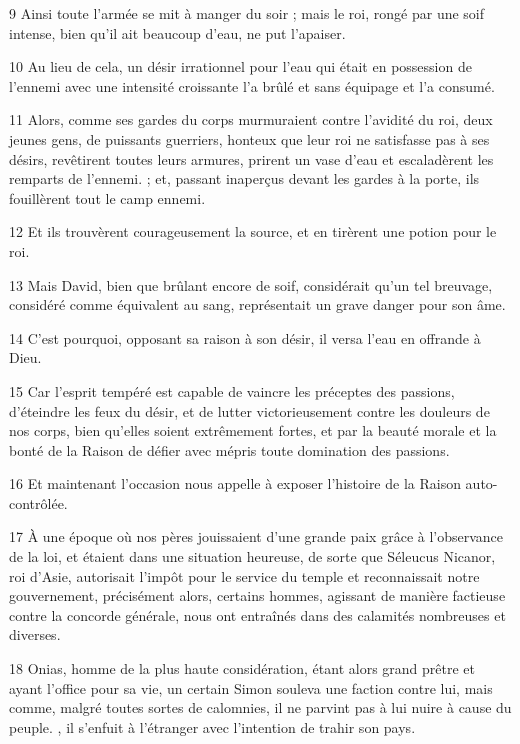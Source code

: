 \par 9 Ainsi toute l'armée se mit à manger du soir ; mais le roi, rongé par une soif intense, bien qu'il ait beaucoup d'eau, ne put l'apaiser.

\par 10 Au lieu de cela, un désir irrationnel pour l'eau qui était en possession de l'ennemi avec une intensité croissante l'a brûlé et sans équipage et l'a consumé.

\par 11 Alors, comme ses gardes du corps murmuraient contre l'avidité du roi, deux jeunes gens, de puissants guerriers, honteux que leur roi ne satisfasse pas à ses désirs, revêtirent toutes leurs armures, prirent un vase d'eau et escaladèrent les remparts de l'ennemi. ; et, passant inaperçus devant les gardes à la porte, ils fouillèrent tout le camp ennemi.

\par 12 Et ils trouvèrent courageusement la source, et en tirèrent une potion pour le roi.

\par 13 Mais David, bien que brûlant encore de soif, considérait qu'un tel breuvage, considéré comme équivalent au sang, représentait un grave danger pour son âme.

\par 14 C'est pourquoi, opposant sa raison à son désir, il versa l'eau en offrande à Dieu.

\par 15 Car l'esprit tempéré est capable de vaincre les préceptes des passions, d'éteindre les feux du désir, et de lutter victorieusement contre les douleurs de nos corps, bien qu'elles soient extrêmement fortes, et par la beauté morale et la bonté de la Raison de défier avec mépris toute domination des passions.

\par 16 Et maintenant l'occasion nous appelle à exposer l'histoire de la Raison auto-contrôlée.

\par 17 À une époque où nos pères jouissaient d'une grande paix grâce à l'observance de la loi, et étaient dans une situation heureuse, de sorte que Séleucus Nicanor, roi d'Asie, autorisait l'impôt pour le service du temple et reconnaissait notre gouvernement, précisément alors, certains hommes, agissant de manière factieuse contre la concorde générale, nous ont entraînés dans des calamités nombreuses et diverses.

\par 18 Onias, homme de la plus haute considération, étant alors grand prêtre et ayant l'office pour sa vie, un certain Simon souleva une faction contre lui, mais comme, malgré toutes sortes de calomnies, il ne parvint pas à lui nuire à cause du peuple. , il s'enfuit à l'étranger avec l'intention de trahir son pays.

